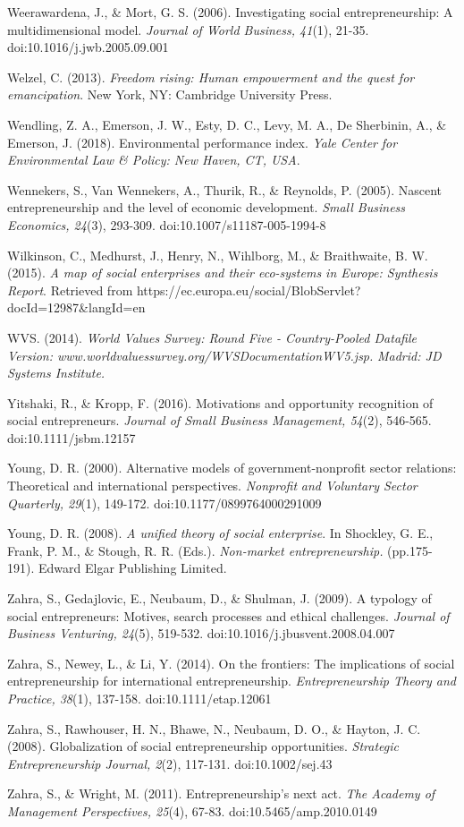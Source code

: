 \documentclass{article}
\begin{document}
Weerawardena, J., \& Mort, G. S. (2006). Investigating social entrepreneurship: A multidimensional model. \emph{Journal of World Business, 41}(1), 21-35. doi:10.1016/j.jwb.2005.09.001

Welzel, C. (2013). \emph{Freedom rising: Human empowerment and the quest for emancipation}. New York, NY: Cambridge University Press.

Wendling, Z. A., Emerson, J. W., Esty, D. C., Levy, M. A., De Sherbinin, A., \& Emerson, J. (2018). Environmental performance index. \emph{Yale }\emph{Center}\emph{ for Environmental Law \& Policy: New Haven, CT, USA}. 

Wennekers, S., Van Wennekers, A., Thurik, R., \& Reynolds, P. (2005). Nascent entrepreneurship and the level of economic development. \emph{Small Business Economics, 24}(3), 293-309. doi:10.1007/s11187-005-1994-8

Wilkinson, C., Medhurst, J., Henry, N., Wihlborg, M., \& Braithwaite, B. W. (2015). \emph{A map of social enterprises and their eco-systems in Europe: Synthesis Report}. Retrieved from https://ec.europa.eu/social/BlobServlet?docId=12987\&langId=en

WVS. (2014). \emph{World Values Survey: Round Five - Country-Pooled Datafile Version: www.worldvaluessurvey.org/WVSDocumentationWV5.jsp. }\emph{Madrid: JD Systems Institute.} 

Yitshaki, R., \& Kropp, F. (2016). Motivations and opportunity recognition of social entrepreneurs. \emph{Journal of Small Business Management, 54}(2), 546-565. doi:10.1111/jsbm.12157

Young, D. R. (2000). Alternative models of government-nonprofit sector relations: Theoretical and international perspectives. \emph{Nonprofit}\emph{ and Voluntary Sector Quarterly, 29}(1), 149-172. doi:10.1177/0899764000291009

Young, D. R. (2008). \emph{A unified theory of social enterprise}. In Shockley, G. E., Frank, P. M., \& Stough, R. R. (Eds.). \emph{Non-market entrepreneurship. }(pp.175-191). Edward Elgar Publishing Limited. 

Zahra, S., Gedajlovic, E., Neubaum, D., \& Shulman, J. (2009). A typology of social entrepreneurs: Motives, search processes and ethical challenges. \emph{Journal of Business Venturing, 24}(5), 519-532. doi:10.1016/j.jbusvent.2008.04.007

Zahra, S., Newey, L., \& Li, Y. (2014). On the frontiers: The implications of social entrepreneurship for international entrepreneurship. \emph{Entrepreneurship Theory and Practice, 38}(1), 137-158. doi:10.1111/etap.12061

Zahra, S., Rawhouser, H. N., Bhawe, N., Neubaum, D. O., \& Hayton, J. C. (2008). Globalization of social entrepreneurship opportunities. \emph{Strategic Entrepreneurship Journal, 2}(2), 117-131. doi:10.1002/sej.43

Zahra, S., \& Wright, M. (2011). Entrepreneurship's next act. \emph{The Academy of Management Perspectives, 25}(4), 67-83. doi:10.5465/amp.2010.0149
\end{document}

